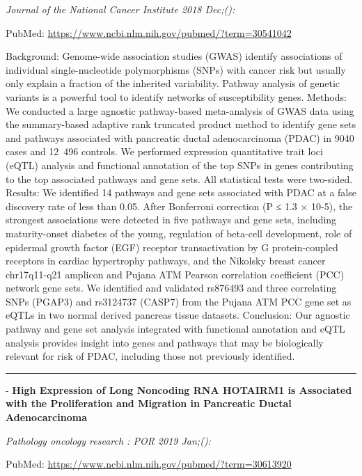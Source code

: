 \documentclass[]{article}
\begin{document}
\emph{Journal of the National Cancer Institute 2018 Dec;():}

PubMed: \url{https://www.ncbi.nlm.nih.gov/pubmed/?term=30541042}

Background: Genome-wide association studies (GWAS) identify associations
of individual single-nucleotide polymorphisms (SNPs) with cancer risk
but usually only explain a fraction of the inherited variability.
Pathway analysis of genetic variants is a powerful tool to identify
networks of susceptibility genes. Methods: We conducted a large agnostic
pathway-based meta-analysis of GWAS data using the summary-based
adaptive rank truncated product method to identify gene sets and
pathways associated with pancreatic ductal adenocarcinoma (PDAC) in 9040
cases and 12~496 controls. We performed expression quantitative trait
loci (eQTL) analysis and functional annotation of the top SNPs in genes
contributing to the top associated pathways and gene sets. All
statistical tests were two-sided. Results: We identified 14 pathways and
gene sets associated with PDAC at a false discovery rate of less than
0.05. After Bonferroni correction (P ≤ 1.3 × 10-5), the strongest
associations were detected in five pathways and gene sets, including
maturity-onset diabetes of the young, regulation of beta-cell
development, role of epidermal growth factor (EGF) receptor
transactivation by G protein-coupled receptors in cardiac hypertrophy
pathways, and the Nikolsky breast cancer chr17q11-q21 amplicon and
Pujana ATM Pearson correlation coefficient (PCC) network gene sets. We
identified and validated rs876493 and three correlating SNPs (PGAP3) and
rs3124737 (CASP7) from the Pujana ATM PCC gene set as eQTLs in two
normal derived pancreas tissue datasets. Conclusion: Our agnostic
pathway and gene set analysis integrated with functional annotation and
eQTL analysis provides insight into genes and pathways that may be
biologically relevant for risk of PDAC, including those not previously
identified.

{}

{}

\begin{center}\rule{0.5\linewidth}{\linethickness}\end{center}

 - \textbf{High Expression of Long Noncoding RNA HOTAIRM1 is Associated
with the Proliferation and Migration in Pancreatic Ductal
Adenocarcinoma}

\emph{Pathology oncology research : POR 2019 Jan;():}

PubMed: \url{https://www.ncbi.nlm.nih.gov/pubmed/?term=30613920}
\end{document}
